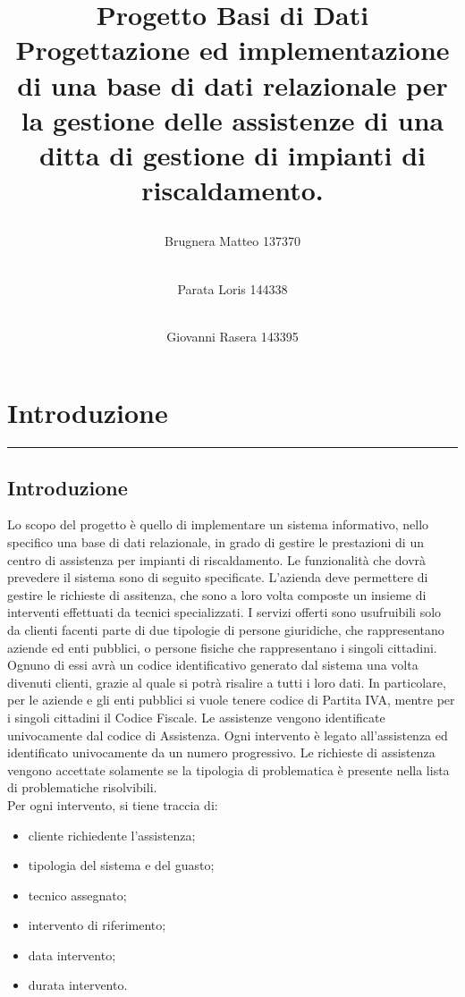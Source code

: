 \documentclass[legalpaper]{article}
\begin{document}
\title{%
\raggedright \textbf{Progetto Basi di Dati} \\ \large \bigskip Progettazione ed implementazione di una base di dati relazionale per la gestione delle assistenze di una ditta di gestione di impianti di riscaldamento.}
\maketitle

\begin{flushleft}
\author{Brugnera Matteo 137370 \and \\ Parata Loris 144338 \and \\ Giovanni Rasera 143395}

\end{flushleft}

\newpage

\tableofcontents

\newpage
\section{Introduzione}
\rule{\linewidth}{1.5pt}
\subsection{Introduzione}
Lo scopo del progetto è quello di implementare un sistema informativo, nello specifico una base di dati relazionale, in grado di gestire le prestazioni di un centro di assistenza per impianti di riscaldamento. 
Le funzionalità che dovrà prevedere il sistema sono di seguito specificate.
L'azienda deve permettere di gestire le richieste di assitenza, che sono a loro volta composte un insieme di interventi effettuati da tecnici specializzati.
I servizi offerti sono usufruibili solo da clienti facenti parte di due tipologie di persone giuridiche, che rappresentano aziende ed enti pubblici, o persone fisiche che rappresentano i singoli cittadini.
Ognuno di essi avrà un codice identificativo generato dal sistema una volta divenuti clienti, grazie al quale si potrà risalire a tutti i loro dati. 
In particolare, per le aziende e gli enti pubblici si vuole tenere codice di Partita IVA, mentre per i singoli cittadini il Codice Fiscale.
Le assistenze vengono identificate univocamente dal codice di Assistenza. Ogni intervento è legato all'assistenza ed identificato univocamente da un numero progressivo. 
Le richieste di assistenza vengono accettate solamente se la tipologia di problematica è presente nella lista di problematiche risolvibili. \\
Per ogni intervento, si tiene traccia di:
\medskip
\begin{itemize}
    \item cliente richiedente l'assistenza;
    \item tipologia del sistema e del guasto;
    \item tecnico assegnato;
    \item intervento di riferimento;
    \item data intervento;
    \item durata intervento.
\end{itemize}
\end{document}

